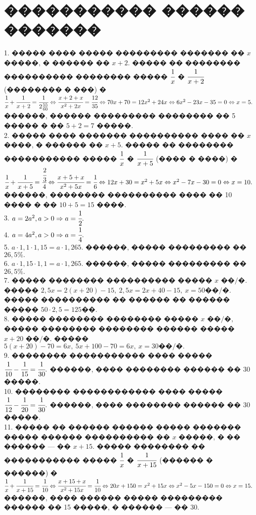 \documentclass[12pt]{article}
\begin{document}
\section{����������� ������ �������}
1. ����� ���� ����� ��������� ������� �� $x$ �����, � ������ �� $x+2.$ ����� �� �������� ���������� �������� ����� $\cfrac{1}{x}$ � $\cfrac{1}{x+2}$ (�������� � ���) � $\cfrac{1}{x}+\cfrac{1}{x+2}=\cfrac{1}{2\frac{55}{60}}\Leftrightarrow \cfrac{x+2+x}{x^2+2x}=\cfrac{12}{35}\Leftrightarrow
70x+70=12x^2+24x\Leftrightarrow6x^2-23x-35=0\Leftrightarrow x=5.$ ������, ������ ��������� �������� �� 5 ����� � �� $5+2=7$ �����.\\
2. ����� ���� ������� ���������� ���� �� $x$ ����, � ������ �� $x+5.$ ����� �� �������� ����������� ����� $\cfrac{1}{x}$ � $\cfrac{1}{x+5}$ (���� � ����) � $\cfrac{1}{x}+\cfrac{1}{x+5}=\cfrac{\cfrac{2}{3}}{4}\Leftrightarrow \cfrac{x+5+x}{x^2+5x}=\cfrac{1}{6}\Leftrightarrow
12x+30=x^2+5x\Leftrightarrow x^2-7x-30=0\Leftrightarrow x=10.$ ������, �������� ���������� ���� �� 10 ���� � �� $10+5=15$ ����.\\
3. $a=2a^2, a>0\Rightarrow a=\cfrac{1}{2}.$\\
4. $a=4a^2, a>0\Rightarrow a=\cfrac{1}{4}.$\\
5. $a\cdot1,1\cdot1,15=a\cdot1,265.$ ������, ����� ��������� �� $26,5\%.$\\
6. $a\cdot1,15\cdot1,1=a\cdot1,265.$ ������, ����� ��������� �� $26,5\%.$\\
7. ����� �������� ���������� ����� $x\text{ ��/�}.$ ����� $2,5x=2(x+20)-15,\ 2,5x=2x+40-15,\ x=50\text{��/�}.$ ����� ���������� �� ������ �� ������ ����� $50\cdot2,5=125$��.\\
8. ����� �������� �������� ����� $x\text{ ��/�},$ ����� �������� �������� ������ ����� $x+20\text{ ��/�}.$ ����� $5(x+20)-70=6x,\ 5x+100-70=6x,\ x=30\text{��/�}.$\\
9. �������� ����������� ���� ����� $\cfrac{1}{10}-\cfrac{1}{15}=\cfrac{1}{30}.$ ������, ���� �������� ������ �� 30 �����.\\
10. �������� ������������ ���� ����� $\cfrac{1}{12}-\cfrac{1}{20}=\cfrac{1}{30}.$ ������, ���� �������� ������ �� 30 �����.\\
11. ����� �� ������ ������ ����� ������� ����� ������ ���������� �� $x$ �����, � �� ������ --- �� $x+15.$ ����� �������� �� ����������� ����� $\cfrac{1}{x}$ �
$\cfrac{1}{x+15}$ (������ � ������) � $\cfrac{1}{x}+\cfrac{1}{x+15}=\cfrac{1}{10}\Leftrightarrow\cfrac{x+15+x}{x^2+15x}=\cfrac{1}{10}\Leftrightarrow
20x+150=x^2+15x\Leftrightarrow x^2-5x-150=0\Leftrightarrow x=15.$ ������, ���� ������ ����� ��������� ������ �� 15 �����, � ������ --- �� 30.\\
\end{document}
